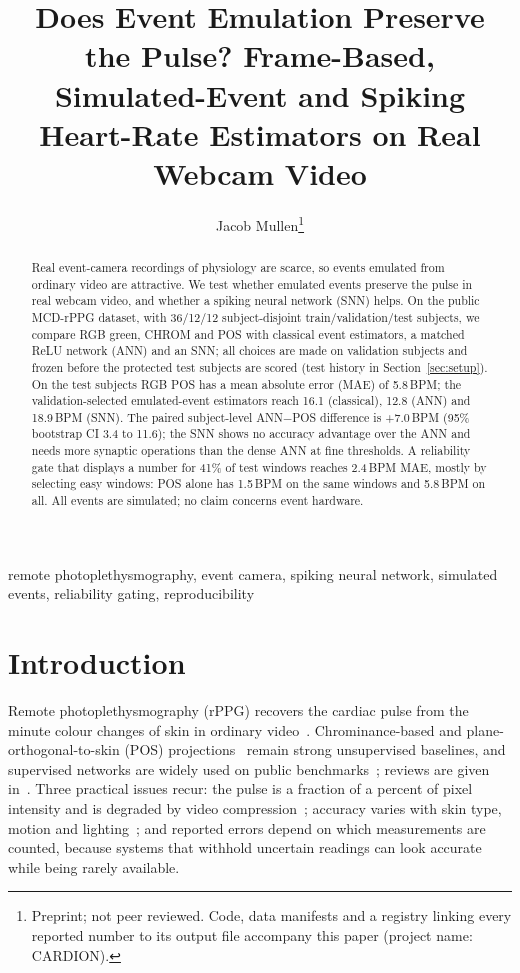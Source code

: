 \documentclass[10pt,journal]{IEEEtran}
\begin{document}
\title{Does Event Emulation Preserve the Pulse? Frame-Based, Simulated-Event and Spiking Heart-Rate Estimators on Real Webcam Video}
\author{Jacob Mullen\thanks{Preprint; not peer reviewed. Code, data manifests and a registry linking every reported number to its output file accompany this paper (project name: CARDION).}}
\maketitle

\begin{abstract}
Real event-camera recordings of physiology are scarce, so events emulated from ordinary video are attractive.
We test whether emulated events preserve the pulse in real webcam video, and whether a spiking neural network (SNN) helps.
On the public MCD-rPPG dataset, with 36/12/12 subject-disjoint train/validation/test subjects, we compare RGB green, CHROM and POS with classical event estimators, a matched ReLU network (ANN) and an SNN; all choices are made on validation subjects and frozen before the protected test subjects are scored (test history in Section~\ref{sec:setup}).
On the test subjects RGB POS has a mean absolute error (MAE) of 5.8\,BPM; the validation-selected emulated-event estimators reach 16.1 (classical), 12.8 (ANN) and 18.9\,BPM (SNN).
The paired subject-level ANN$-$POS difference is +7.0\,BPM (95\% bootstrap CI 3.4 to 11.6); the SNN shows no accuracy advantage over the ANN and needs more synaptic operations than the dense ANN at fine thresholds.
A reliability gate that displays a number for 41\% of test windows reaches 2.4\,BPM MAE, mostly by selecting easy windows: POS alone has 1.5\,BPM on the same windows and 5.8\,BPM on all.
All events are simulated; no claim concerns event hardware.
\end{abstract}

\begin{IEEEkeywords}
remote photoplethysmography, event camera, spiking neural network, simulated events, reliability gating, reproducibility
\end{IEEEkeywords}

\section{Introduction}
Remote photoplethysmography (rPPG) recovers the cardiac pulse from the minute colour changes of skin in ordinary video~\cite{verkruysse2008,poh2010}. Chrominance-based and plane-orthogonal-to-skin (POS) projections~\cite{dehaan2013chrom,wang2017pos} remain strong unsupervised baselines, and supervised networks are widely used on public benchmarks~\cite{chen2018deepphys,yu2019physnet,yu2022physformer,liu2023efficientphys,liu2023rppgtoolbox}; reviews are given in~\cite{rouast2018,mcduff2023survey}. Three practical issues recur: the pulse is a fraction of a percent of pixel intensity and is degraded by video compression~\cite{mcduff2017compression,rapczynski2019,yu2019compressed}; accuracy varies with skin type, motion and lighting~\cite{nowara2020skin}; and reported errors depend on which measurements are counted, because systems that withhold uncertain readings can look accurate while being rarely available.
\end{document}
